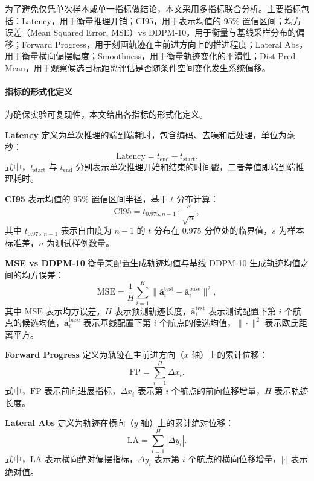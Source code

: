 为了避免仅凭单次样本或单一指标做结论，本文采用多指标联合分析。主要指标包括：Latency，用于衡量推理开销；CI95，用于表示均值的 95\% 置信区间；均方误差（Mean Squared Error, MSE）vs DDPM-10，用于衡量与基线采样分布的偏移；Forward Progress，用于刻画轨迹在主前进方向上的推进程度；Lateral Abs，用于衡量横向偏摆幅度；Smoothness，用于衡量轨迹变化的平滑性；Dist Pred Mean，用于观察候选目标距离评估是否随条件空间变化发生系统偏移。

\paragraph*{指标的形式化定义}

为确保实验可复现性，本文给出各指标的形式化定义。

\textbf{Latency} 定义为单次推理的端到端耗时，包含编码、去噪和后处理，单位为毫秒：
\begin{equation}
\text{Latency} = t_{\text{end}} - t_{\text{start}}.
\end{equation}
式中，$t_{\text{start}}$ 与 $t_{\text{end}}$ 分别表示单次推理开始和结束的时间戳，二者差值即端到端推理耗时。

\textbf{CI95} 表示均值的 95\% 置信区间半径，基于 $t$ 分布计算：
\begin{equation}
\text{CI95} = t_{0.975, n-1} \cdot \frac{s}{\sqrt{n}},
\end{equation}
其中 $t_{0.975,n-1}$ 表示自由度为 $n-1$ 的 $t$ 分布在 0.975 分位处的临界值，$s$ 为样本标准差，$n$ 为测试样例数量。

\textbf{MSE vs DDPM-10} 衡量某配置生成轨迹均值与基线 DDPM-10 生成轨迹均值之间的均方误差：
\begin{equation}
\text{MSE} = \frac{1}{H} \sum_{i=1}^{H} \|\bar{\mathbf{a}}_i^{\text{test}} - \bar{\mathbf{a}}_i^{\text{base}}\|^2,
\end{equation}
其中 $\text{MSE}$ 表示均方误差，$H$ 表示预测轨迹长度，$\bar{\mathbf{a}}_i^{\text{test}}$ 表示测试配置下第 $i$ 个航点的候选均值，$\bar{\mathbf{a}}_i^{\text{base}}$ 表示基线配置下第 $i$ 个航点的候选均值，$\|\cdot\|^2$ 表示欧氏距离平方。

\textbf{Forward Progress} 定义为轨迹在主前进方向（$x$ 轴）上的累计位移：
\begin{equation}
\text{FP} = \sum_{i=1}^{H} \Delta x_i.
\end{equation}
式中，$\text{FP}$ 表示前向进展指标，$\Delta x_i$ 表示第 $i$ 个航点的前向位移增量，$H$ 表示轨迹长度。

\textbf{Lateral Abs} 定义为轨迹在横向（$y$ 轴）上的累计绝对位移：
\begin{equation}
\text{LA} = \sum_{i=1}^{H} |\Delta y_i|.
\end{equation}
式中，$\text{LA}$ 表示横向绝对偏摆指标，$\Delta y_i$ 表示第 $i$ 个航点的横向位移增量，$|\cdot|$ 表示绝对值。

